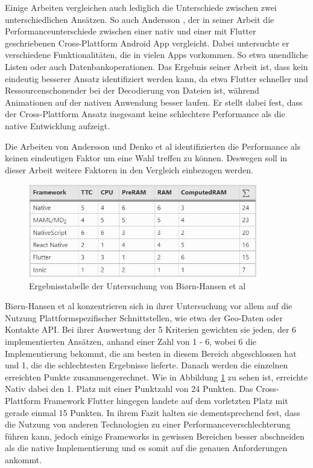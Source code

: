 Einige Arbeiten vergleichen auch lediglich die Unterschiede zwischen zwei unterschiedlichen Ansätzen. So auch Andersson \cite{Andersson_2022}, der in seiner Arbeit die Performanceunterschiede zwischen einer nativ und einer mit Flutter geschriebenen Cross-Plattform Android App vergleicht. Dabei untersuchte er verschiedene Funktionalitäten, die in vielen Apps vorkommen. So etwa unendliche Listen oder auch Datenbankoperationen. Das Ergebnis seiner Arbeit ist, dass kein eindeutig besserer Ansatz identifiziert werden kann, da etwa Flutter schneller und Ressourcenschonender bei der Decodierung von Dateien ist, während Animationen auf der nativen Anwendung besser laufen. Er stellt dabei fest, dass der Cross-Plattform Ansatz insgesamt keine schlechtere Performance als die native Entwicklung aufzeigt.

Die Arbeiten von Andersson und Denko et al identifizierten die Performance als keinen eindeutigen Faktor um eine Wahl treffen zu können. Deswegen soll in dieser Arbeit weitere Faktoren in den Vergleich einbezogen werden.

\begin{figure}[ht]
  \centering
  \includegraphics[width=10cm,keepaspectratio]{images/Biorn-Hansen_Result_table.jpg}
  \caption[Ergebnisstabelle der Untersuchung von Biørn-Hansen et al]{Ergebnisstabelle der Untersuchung von Biørn-Hansen et al \cite{BirnHansen.2020}}
  \label{fig:result_table_Biorn}
\end{figure}

Biørn-Hansen et al \cite{BirnHansen.2020} konzentrieren sich in ihrer Untersuchung vor allem auf die Nutzung Plattformspezifischer Schnittstellen, wie etwa der Geo-Daten oder Kontakte \ac{API}. Bei ihrer Auswertung der 5 Kriterien gewichten sie jeden, der 6 implementierten Ansätzen, anhand einer Zahl von 1 - 6, wobei 6 die Implementierung bekommt, die am besten in diesem Bereich abgeschlossen hat und 1, die die schlechtesten Ergebnisse lieferte. Danach werden die einzelnen erreichten Punkte zusammengerechnet. Wie in Abbildung \ref{fig:result_table_Biorn} zu sehen ist, erreichte Nativ dabei den 1. Platz mit einer Punktzahl von 24 Punkten. Das Cross-Plattform Framework Flutter hingegen landete auf dem vorletzten Platz mit gerade einmal 15 Punkten. In ihrem Fazit halten sie dementsprechend fest, dass die Nutzung von anderen Technologien zu einer Performanceverschlechterung führen kann, jedoch einige Frameworks in gewissen Bereichen besser abschneiden als die native Implementierung und es somit auf die genauen Anforderungen ankommt.

